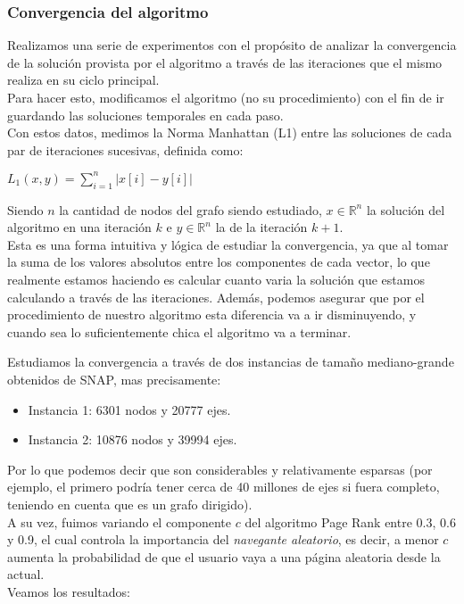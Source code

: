 \subsubsection{Convergencia del algoritmo}

Realizamos una serie de experimentos con el propósito de analizar la convergencia de la solución provista por el algoritmo a través de las iteraciones que el mismo realiza en su ciclo principal.\\
Para hacer esto, modificamos el algoritmo (no su procedimiento) con el fin de ir guardando las soluciones temporales en cada paso.\\
Con estos datos, medimos la Norma Manhattan (L1) entre las soluciones de cada par de iteraciones sucesivas, definida como:

\begin{center}
$L_1(x,y) = \sum\limits_{i=1}^n | x[i] - y[i] | $
\end{center}

Siendo $n$ la cantidad de nodos del grafo siendo estudiado, $x \in \mathbb{R}^{n}$ la solución del algoritmo en una iteración $k$ e $y \in \mathbb{R}^{n}$ la de la iteración $k+1$.\\
Esta es una forma intuitiva y lógica de estudiar la convergencia, ya que al tomar la suma de los valores absolutos entre los componentes de cada vector, lo que realmente estamos haciendo es calcular cuanto varia la solución que estamos calculando a través de las iteraciones. Además, podemos asegurar que por el procedimiento de nuestro algoritmo esta diferencia va a ir disminuyendo, y cuando sea lo suficientemente chica el algoritmo va a terminar.

Estudiamos la convergencia a través de dos instancias de tamaño mediano-grande obtenidos de SNAP, mas precisamente:
\begin{itemize}
    \item Instancia 1: 6301 nodos y 20777 ejes.
    \item Instancia 2: 10876 nodos y 39994 ejes.
\end{itemize}
Por lo que podemos decir que son considerables y relativamente esparsas (por ejemplo, el primero podría tener cerca de 40 millones de ejes si fuera completo, teniendo en cuenta que es un grafo dirigido).\\
A su vez, fuimos variando el componente $c$ del algoritmo Page Rank entre 0.3, 0.6 y 0.9, el cual controla la importancia del \textit{navegante aleatorio}, es decir, a menor $c$ aumenta la probabilidad de que el usuario vaya a una página aleatoria desde la actual.\\
Veamos los resultados:

